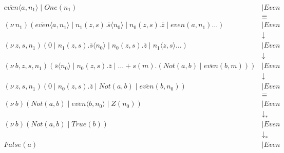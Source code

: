 \documentclass[a4paper, openany]{memoir}
\theoremstyle{definition}
\begin{document}
    \begin{align*}
        \overline{\textit{even}} \langle a, n_1 \rangle \mid \textit{One}(n_1) &\mid \textit{Even} \\
        &\equiv \\
        (\nu \ n_1)(\overline{\textit{even}} \langle a, n_1\rangle \mid n_1(z, s).\overline{s} \langle n_0 \rangle \mid n_0(z, s).\overline{z} \mid \textit{even}(a, n_1)\dots) &\mid \textit{Even} \\
        &\downarrow \\
        (\nu \ z, s, n_1)(0 \mid n_1(z, s).\overline{s} \langle n_0 \rangle \mid n_0(z, s).\overline{z} \mid n_1\langle z, s \rangle \dots) &\mid \textit{Even} \\
        &\downarrow \\
        (\nu \ b, z, s, n_1)(\overline{s} \langle n_0 \rangle \mid n_0(z, s).\overline{z} \mid \dots + s(m).(\textit{Not}(a, b) \mid \overline{\textit{even}}(b, m))) &\mid \textit{Even} \\
        &\downarrow \\
        (\nu \ z, s, n_1)(0 \mid n_0(z, s).\overline{z} \mid \textit{Not}(a, b) \mid \overline{\textit{even}}(b, n_0)) &\mid \textit{Even} \\
        &\equiv \\
        (\nu \ b)(\textit{Not}(a, b) \mid \overline{\textit{even}} \langle b, n_0\rangle \mid Z(n_0)) &\mid \textit{Even} \\
        &\downarrow_* \\
        (\nu \ b)(\textit{Not}(a, b) \mid \textit{True}(b)) &\mid \textit{Even} \\
        &\downarrow_* \\
        \textit{False}(a) &\mid \textit{Even}
    \end{align*}
\end{document}
